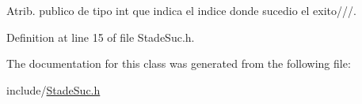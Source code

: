 Atrib. publico de tipo int que indica el indice donde sucedio el exito///. 



Definition at line 15 of file Stade\+Suc.\+h.



The documentation for this class was generated from the following file\+:\begin{DoxyCompactItemize}
\item 
include/\hyperlink{_stade_suc_8h}{Stade\+Suc.\+h}\end{DoxyCompactItemize}
